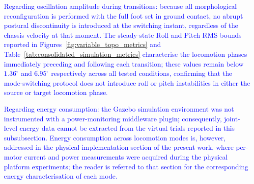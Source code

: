 \documentclass[preprint,12pt]{elsarticle}
\newcommand{\revblue}[1]{\textcolor{blue}{#1}}
\begin{document}
\revblue{%
Regarding oscillation amplitude during transitions:
because all morphological reconfiguration is performed with the
full foot set in ground contact, no abrupt postural discontinuity
is introduced at the switching instant, regardless of the chassis
velocity at that moment.
The steady-state Roll and Pitch RMS bounds reported in
Figures~\ref{fig:variable_topo_metrics}
and Table~\ref{tab:consolidated_simulation_metrics}
characterise the locomotion phases immediately preceding and
following each transition; these values remain below $1.36^\circ$
and $6.95^\circ$ respectively across all tested conditions,
confirming that the mode-switching protocol does not introduce
roll or pitch instabilities in either the source or target
locomotion phase.
}

\revblue{%
Regarding energy consumption:
the Gazebo simulation environment was not instrumented with a
power-monitoring middleware plugin; consequently, joint-level energy
data cannot be extracted from the virtual trials reported in this
subsubsection.
Energy consumption across locomotion modes is, however, addressed
in the physical implementation section of the present work, where
per-motor current and power measurements were acquired during the
physical platform experiments; the reader is referred to that
section for the corresponding energy characterisation of each mode.
}
\end{document}
